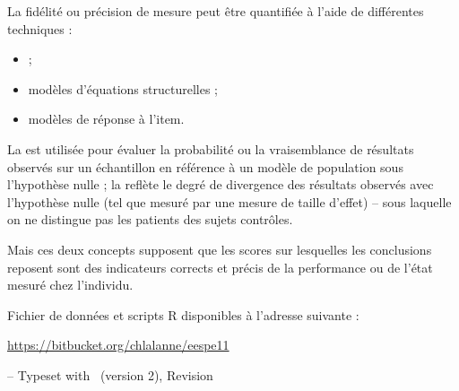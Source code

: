 
La fidélité ou précision de mesure peut être quantifiée à l'aide de différentes
techniques :
\begin{itemize}
\item {} ;
\item modèles d'équations structurelles ;
\item modèles de réponse à l'item.
\end{itemize}


La  est utilisée pour évaluer la
probabilité ou la vraisemblance de résultats observés sur un échantillon en
référence à un modèle de population sous l'hypothèse nulle ; la
 reflète le degré de divergence
des résultats observés avec l'hypothèse nulle (tel que mesuré par une mesure de
taille d'effet) -- sous laquelle on ne distingue pas les patients des sujets
contrôles\autocite{Thompson2003}.

Mais ces deux concepts supposent que les scores sur lesquelles les conclusions
reposent sont des indicateurs corrects et précis de la performance ou de l'état
mesuré chez l'individu.

\foilhead{}

\foilhead{}

Fichier de données et scripts R disponibles à l'adresse suivante :\newline
{\centering \url{https://bitbucket.org/chlalanne/eespe11}\par}
\vfill

\raggedleft \scriptsize -- Typeset with \FoilTeX\ (version 2), Revision \VCRevision


